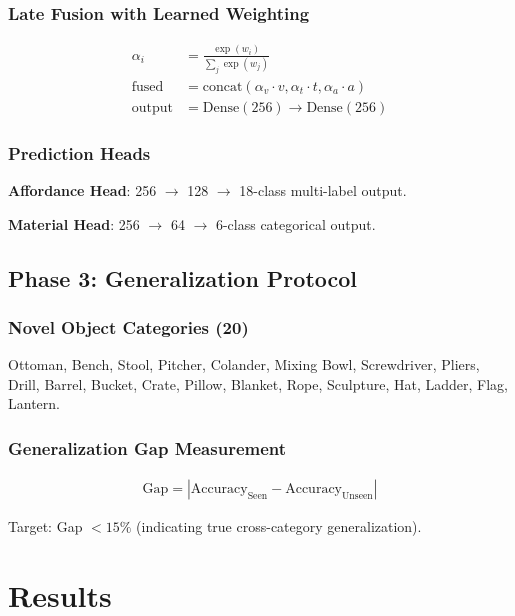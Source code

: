 \documentclass[11pt]{article}
\begin{document}
\subsubsection{Late Fusion with Learned Weighting}

\begin{align}
\alpha_i &= \frac{\exp(w_i)}{\sum_j \exp(w_j)} \\
\text{fused} &= \text{concat}(\alpha_v \cdot v, \alpha_t \cdot t, \alpha_a \cdot a) \\
\text{output} &= \text{Dense}(256) \to \text{Dense}(256)
\end{align}

\subsubsection{Prediction Heads}

\textbf{Affordance Head}: 256 $\to$ 128 $\to$ 18-class multi-label output.

\textbf{Material Head}: 256 $\to$ 64 $\to$ 6-class categorical output.

\subsection{Phase 3: Generalization Protocol}

\subsubsection{Novel Object Categories (20)}

Ottoman, Bench, Stool, Pitcher, Colander, Mixing Bowl, Screwdriver, Pliers, Drill, Barrel, Bucket, Crate, Pillow, Blanket, Rope, Sculpture, Hat, Ladder, Flag, Lantern.

\subsubsection{Generalization Gap Measurement}

\begin{align}
\text{Gap} = |\text{Accuracy}_{\text{Seen}} - \text{Accuracy}_{\text{Unseen}}|
\end{align}

Target: Gap $< 15\%$ (indicating true cross-category generalization).

\section{Results}
\end{document}
